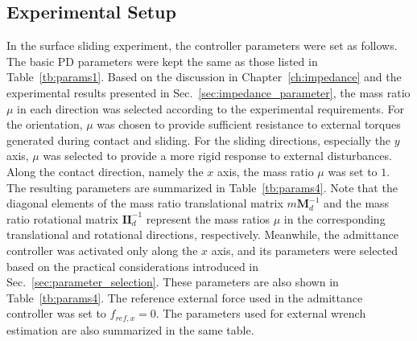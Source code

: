 \subsection{Experimental Setup}
In the surface sliding experiment, the controller parameters were set as follows. The basic PD parameters were kept the same as those listed in Table~\ref{tb:params1}. Based on the discussion in Chapter~\ref{ch:impedance} and the experimental results presented in Sec.~\ref{sec:impedance_parameter}, the mass ratio $\mu$ in each direction was selected according to the experimental requirements. For the orientation, $\mu$ was chosen to provide sufficient resistance to external torques generated during contact and sliding. For the sliding directions, especially the $y$ axis, $\mu$ was selected to provide a more rigid response to external disturbances. Along the contact direction, namely the $x$ axis, the mass ratio $\mu$ was set to $1$. The resulting parameters are summarized in Table~\ref{tb:params4}. Note that the diagonal elements of the mass ratio translational matrix $m\boldsymbol{M}_d^{-1}$ and the mass ratio rotational matrix $\boldsymbol{I}\boldsymbol{I}_d^{-1}$ represent the mass ratios $\mu$ in the corresponding translational and rotational directions, respectively. Meanwhile, the admittance controller was activated only along the $x$ axis, and its parameters were selected based on the practical considerations introduced in Sec.~\ref{sec:parameter_selection}. These parameters are also shown in Table~\ref{tb:params4}. The reference external force used in the admittance controller was set to $f_{ref,x}=0$. The parameters used for external wrench estimation are also summarized in the same table.



